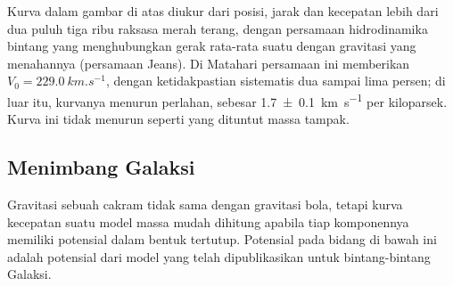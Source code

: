 \begin{omfigure}
\par{}\label{fig:b3:milky-way-galaxies:rotation}
\end{omfigure}

Kurva dalam gambar di atas diukur dari posisi, jarak
dan kecepatan lebih dari dua puluh tiga ribu raksasa merah terang,
dengan persamaan hidrodinamika bintang yang menghubungkan gerak rata-rata
suatu  dengan gravitasi yang menahannya (persamaan Jeans).
Di Matahari persamaan ini memberikan $V_0 = \qty{229.0}{km.s^{-1}}$, dengan
ketidakpastian sistematis dua sampai lima persen; di luar itu, kurvanya menurun
perlahan, sebesar \qty[separate-uncertainty=true]{1.7 \pm 0.1}{km.s^{-1}} per kiloparsek. Kurva ini
tidak menurun seperti yang dituntut massa tampak.

\subsection*{Menimbang Galaksi}

Gravitasi sebuah cakram tidak sama dengan gravitasi bola, tetapi kurva kecepatan
suatu model massa mudah dihitung apabila tiap komponennya memiliki potensial
dalam bentuk tertutup. Potensial pada bidang di bawah ini adalah potensial dari
model yang telah dipublikasikan untuk bintang-bintang Galaksi.

